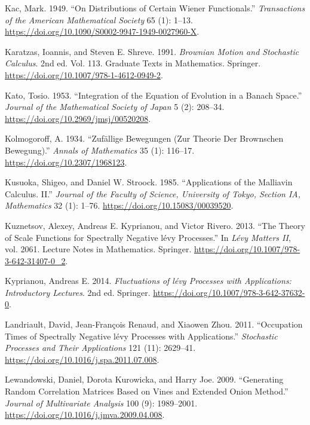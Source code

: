 \documentclass[
  english,
  11pt,
  letterpaper,
  DIV=11,
  numbers=noendperiod]{scrartcl}
\newlength{\cslhangindent}
\newenvironment{CSLReferences}[2] %
 {\begin{list}{}{%
  \setlength{\itemindent}{0pt}
  \setlength{\leftmargin}{0pt}
  \setlength{\parsep}{0pt}
  \ifodd #1
   \setlength{\leftmargin}{\cslhangindent}
   \setlength{\itemindent}{-1\cslhangindent}
  \fi
  \setlength{\itemsep}{#2\baselineskip}}}
 {\end{list}}
\theoremstyle{plain}
\theoremstyle{plain}
\theoremstyle{plain}
\theoremstyle{plain}
\theoremstyle{remark}
\begin{document}
\begin{CSLReferences}{1}{1}
Kac, Mark. 1949. {``On Distributions of Certain Wiener Functionals.''}
\emph{Transactions of the American Mathematical Society} 65 (1): 1--13.
\url{https://doi.org/10.1090/S0002-9947-1949-0027960-X}.

Karatzas, Ioannis, and Steven E. Shreve. 1991. \emph{Brownian Motion and
Stochastic Calculus}. 2nd ed. Vol. 113. Graduate Texts in Mathematics.
Springer. \url{https://doi.org/10.1007/978-1-4612-0949-2}.

Kato, Tosio. 1953. {``Integration of the Equation of Evolution in a
Banach Space.''} \emph{Journal of the Mathematical Society of Japan} 5
(2): 208--34. \url{https://doi.org/10.2969/jmsj/00520208}.

Kolmogoroff, A. 1934. {``Zuf{ä}llige Bewegungen (Zur Theorie Der
Brownschen Bewegung).''} \emph{Annals of Mathematics} 35 (1): 116--17.
\url{https://doi.org/10.2307/1968123}.

Kusuoka, Shigeo, and Daniel W. Stroock. 1985. {``Applications of the
Malliavin Calculus. II.''} \emph{Journal of the Faculty of Science,
University of Tokyo, Section IA, Mathematics} 32 (1): 1--76.
\url{https://doi.org/10.15083/00039520}.

Kuznetsov, Alexey, Andreas E. Kyprianou, and Victor Rivero. 2013. {``The
Theory of Scale Functions for Spectrally Negative l{é}vy Processes.''}
In \emph{L{é}vy Matters II}, vol. 2061. Lecture Notes in Mathematics.
Springer. \url{https://doi.org/10.1007/978-3-642-31407-0_2}.

Kyprianou, Andreas E. 2014. \emph{Fluctuations of l{é}vy Processes with
Applications: Introductory Lectures}. 2nd ed. Springer.
\url{https://doi.org/10.1007/978-3-642-37632-0}.

Landriault, David, Jean-François Renaud, and Xiaowen Zhou. 2011.
{``Occupation Times of Spectrally Negative l{é}vy Processes with
Applications.''} \emph{Stochastic Processes and Their Applications} 121
(11): 2629--41. \url{https://doi.org/10.1016/j.spa.2011.07.008}.

Lewandowski, Daniel, Dorota Kurowicka, and Harry Joe. 2009.
{``Generating Random Correlation Matrices Based on Vines and Extended
Onion Method.''} \emph{Journal of Multivariate Analysis} 100 (9):
1989--2001. \url{https://doi.org/10.1016/j.jmva.2009.04.008}.


\end{CSLReferences}
\end{document}
